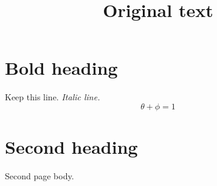 \documentclass[11pt]{article}
\title{Original text}
\author{}
\date{}
\begin{document}
\maketitle
\section{Bold heading}
Keep this line.
\textit{Italic line.}
\[
\theta + \phi = 1
\]
\newpage
\section{Second heading}
Second page body.
\end{document}
